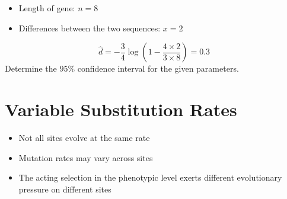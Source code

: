 \documentclass{article}
\begin{document}
\begin{multicols*}{3}
\begin{itemize}
    \item Length of gene: $n = 8$
    \item Differences between the two sequences: $x = 2$
\end{itemize}

$$\hat{d} = -\frac{3}{4}\log\left(1-\frac{4\times 2}{3\times 8}\right) = 0.3$$
Determine the $95 \%$ confidence interval for the given parameters. 

\section{Variable Substitution Rates}

\begin{itemize}
    \item Not all sites evolve at the same rate
    \item Mutation rates may vary across sites \item The acting selection in the phenotypic level exerts different evolutionary pressure on different sites
\end{itemize}
\end{multicols*}
\end{document}
